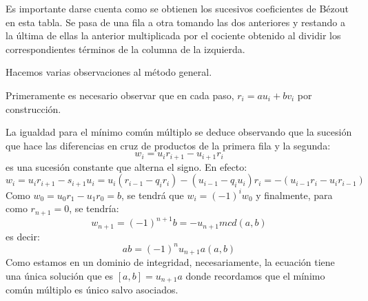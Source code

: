 \begin{theorem}
Es importante darse cuenta como se obtienen los sucesivos coeficientes de Bézout en esta tabla. Se pasa de una fila a otra tomando las dos anteriores y restando a la última de ellas la anterior multiplicada por el cociente obtenido al dividir los correspondientes términos de la columna de la izquierda. 

Hacemos varias observaciones al método general. 

Primeramente es necesario observar que en cada paso, $r_i = a u_i + b v_i$ por construcción. 

La igualdad para el mínimo común múltiplo se deduce observando que la sucesión que hace las diferencias en cruz de productos de la primera fila y la segunda: $$w_i = u_i r_{i+1} - u_{i+1} r_i$$ es una sucesión constante que alterna el signo. En efecto: $$w_i = u_i r_{i+1} - s_{i+1} u_i = u_i (r_{i-1} - q_ir_i) - (u_{i-1} - q_i u_i) r_i = - (u_{i-1} r_i - u_i r_{i-1})$$ Como $w_0 = u_0 r_1 - u_1 r_0 = b$, se tendrá que $w_i = (-1)^i w_0$ y finalmente, para como $r_{n+1} = 0$, se tendría: $$w_{n+1} = (-1)^{n+1} b = - u_{n+1} mcd(a,b)$$ es decir: $$ab = (-1)^n u_{n+1} a (a,b)$$ Como estamos en un dominio de integridad, necesariamente, la ecuación tiene una única solución que es $[a,b] = u_{n+1}a$ donde recordamos que el mínimo común múltiplo es único salvo asociados. 
\end{theorem}

